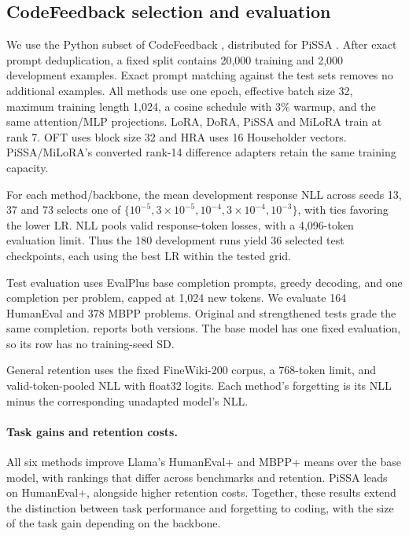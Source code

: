 \subsection{CodeFeedback selection and evaluation}\label{app:coding}
We use the Python subset of CodeFeedback \citep{zheng2024opencodeinterpreter}, distributed for PiSSA \citep{meng2024pissa}. After exact prompt deduplication, a fixed split contains 20,000 training and 2,000 development examples. Exact prompt matching against the test sets removes no additional examples. All methods use one epoch, effective batch size 32, maximum training length 1,024, a cosine schedule with 3\% warmup, and the same attention/MLP projections. LoRA, DoRA, PiSSA and MiLoRA train at rank 7. OFT uses block size 32 and HRA uses 16 Householder vectors. PiSSA/MiLoRA's converted rank-14 difference adapters retain the same training capacity.

For each method/backbone, the mean development response NLL across seeds 13, 37 and 73 selects one of $\{10^{-5},3\times10^{-5},10^{-4},3\times10^{-4},10^{-3}\}$, with ties favoring the lower LR. NLL pools valid response-token losses, with a 4,096-token evaluation limit. Thus the 180 development runs yield 36 selected test checkpoints, each using the best LR within the tested grid. 

Test evaluation uses EvalPlus base completion prompts, greedy decoding, and one completion per problem, capped at 1,024 new tokens. We evaluate 164 HumanEval \citep{chen2021humaneval} and 378 MBPP \citep{austin2021mbpp} problems. Original and strengthened tests grade the same completion.  reports both versions. The base model has one fixed evaluation, so its row has no training-seed SD.

General retention uses the fixed FineWiki-200 corpus, a 768-token limit, and valid-token-pooled NLL with float32 logits. Each method's forgetting is its NLL minus the corresponding unadapted model's NLL. 


\FloatBarrier
\paragraph{Task gains and retention costs.}
All six methods improve Llama's HumanEval+ and MBPP+ means over the base model, with rankings that differ across benchmarks and retention. PiSSA leads on HumanEval+, alongside higher retention costs. Together, these results extend the distinction between task performance and forgetting to coding, with the size of the task gain depending on the backbone.
